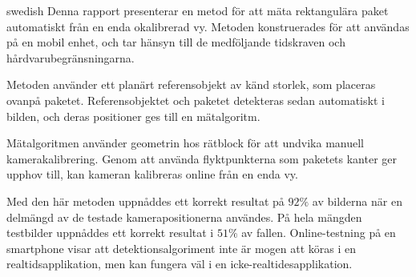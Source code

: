 
\begin{foreignabstract}{swedish}
Denna rapport presenterar en metod för att mäta rektangulära paket automatiskt från en enda okalibrerad vy.
Metoden konstruerades för att användas på en mobil enhet, och tar hänsyn till de medföljande tidskraven och hårdvarubegränsningarna.

Metoden använder ett planärt referensobjekt av känd storlek, som placeras ovanpå paketet.
Referensobjektet och paketet detekteras sedan automatiskt i bilden, och deras positioner ges till en mätalgoritm.

Mätalgoritmen använder geometrin hos rätblock för att undvika manuell kamerakalibrering.
Genom att använda flyktpunkterna som paketets kanter ger upphov till, kan kameran kalibreras online från en enda vy.

Med den här metoden uppnåddes ett korrekt resultat på $92\%$ av bilderna när en delmängd av de testade kamerapositionerna användes.
På hela mängden testbilder uppnåddes ett korrekt resultat i $51\%$ av fallen.
Online-testning på en smartphone visar att detektionsalgoriment inte är mogen att köras i en realtidsapplikation, men kan fungera väl i en icke-realtidesapplikation.
\end{foreignabstract}

